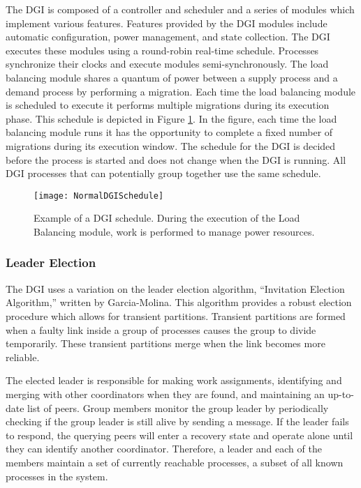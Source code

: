 The DGI is composed of a controller and scheduler and a series of modules which implement various features.
Features provided by the DGI modules include automatic configuration, power management, and state collection.
The \ac{DGI} executes these modules using a round-robin real-time schedule.
Processes synchronize their clocks and execute modules semi-synchronously.
The load balancing module shares a quantum of power between a supply process and a demand process by performing a migration.
Each time the load balancing module is scheduled to execute it performs multiple migrations during its execution phase.
This schedule is depicted in Figure \ref{fig:normal-schedule}.
In the figure, each time the load balancing module runs it has the opportunity to complete a fixed number of migrations during its execution window.
The schedule for the \ac{DGI} is decided before the process is started and does not change when the \ac{DGI} is running.
All \ac{DGI} processes that can potentially group together use the same schedule.

\begin{figure}
\texttt{[image: NormalDGISchedule]}
\caption{Example of a \ac{DGI} schedule. During the execution of the Load Balancing module, work is performed to manage power resources.} \label{fig:normal-schedule}
\end{figure}

\subsubsection{Leader Election}

The \ac{DGI} uses a variation on the leader election algorithm, ``Invitation Election Algorithm,'' written by Garcia-Molina\cite{INVITATIONELECTION}.
This algorithm provides a robust election procedure which allows for transient partitions.
Transient partitions are formed when a faulty link inside a group of processes causes the group to divide temporarily.
These transient partitions merge when the link becomes more reliable.

The elected leader is responsible for making work assignments, identifying and merging with other coordinators when they are found, and maintaining an up-to-date list of peers.
Group members monitor the group leader by periodically checking if the group leader is still alive by sending a message.
If the leader fails to respond, the querying peers will enter a recovery state and operate alone until they can identify another coordinator.
Therefore, a leader and each of the members maintain a set of currently reachable processes, a subset of all known processes in the system.

